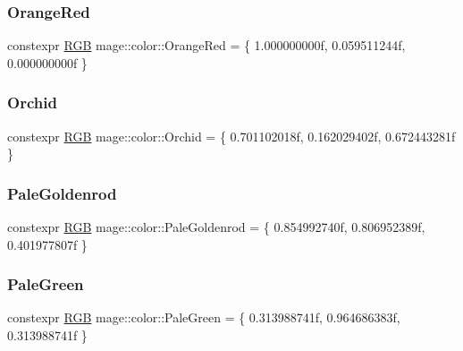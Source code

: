 \mbox{\label{namespacemage_1_1color_a7aa807153f37477c187dac3d059b7f83}} 
\subsubsection{\texorpdfstring{Orange\+Red}{OrangeRed}}
{\footnotesize\ttfamily constexpr \mbox{\hyperlink{structmage_1_1_r_g_b}{R\+GB}} mage\+::color\+::\+Orange\+Red = \{ 1.\+000000000f, 0.\+059511244f, 0.\+000000000f \}}

\mbox{\label{namespacemage_1_1color_a1659e10d131af787628e24db095a5c58}} 
\subsubsection{\texorpdfstring{Orchid}{Orchid}}
{\footnotesize\ttfamily constexpr \mbox{\hyperlink{structmage_1_1_r_g_b}{R\+GB}} mage\+::color\+::\+Orchid = \{ 0.\+701102018f, 0.\+162029402f, 0.\+672443281f \}}

\mbox{\label{namespacemage_1_1color_a504a28b76da12e65cc57019bc2481b6f}} 
\subsubsection{\texorpdfstring{Pale\+Goldenrod}{PaleGoldenrod}}
{\footnotesize\ttfamily constexpr \mbox{\hyperlink{structmage_1_1_r_g_b}{R\+GB}} mage\+::color\+::\+Pale\+Goldenrod = \{ 0.\+854992740f, 0.\+806952389f, 0.\+401977807f \}}

\mbox{\label{namespacemage_1_1color_a1e055d7a69c5f8f9ffdac938889e306a}} 
\subsubsection{\texorpdfstring{Pale\+Green}{PaleGreen}}
{\footnotesize\ttfamily constexpr \mbox{\hyperlink{structmage_1_1_r_g_b}{R\+GB}} mage\+::color\+::\+Pale\+Green = \{ 0.\+313988741f, 0.\+964686383f, 0.\+313988741f \}}

